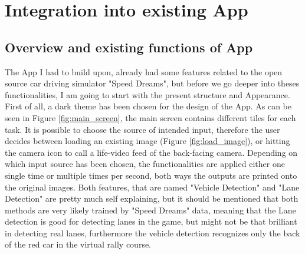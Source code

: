 
\chapter{Integration into existing App}\label{chapter:Integration into existing App}

\section{Overview and existing functions of App}
The App I had to build upon, already had some features related to the open source car driving simulator "Speed Dreams", but before we go deeper into theses functionalities, I am going to start with the present structure and Appearance.
First of all, a dark theme has been chosen for the design of the App. As can be seen in Figure \ref{fig:main_screen}, the main screen contains different tiles for each task. It is possible to choose the source of intended input, therefore the user decides between loading an existing image (Figure \ref{fig:load_image}), or hitting the camera icon to call a life-video feed of the back-facing camera. Depending on which input source has been chosen, the functionalities are applied either one single time or multiple times per second, both ways the outputs are printed onto the original images. Both features, that are named "Vehicle Detection" and "Lane Detection" are pretty much self explaining, but it should be mentioned that both methods are very likely trained by "Speed Dreams" data, meaning that the Lane detection is good for detecting lanes in the game, but might not be that brilliant in detecting real lanes, furthermore the vehicle detection recognizes only the back of the red car in the virtual rally course. 


